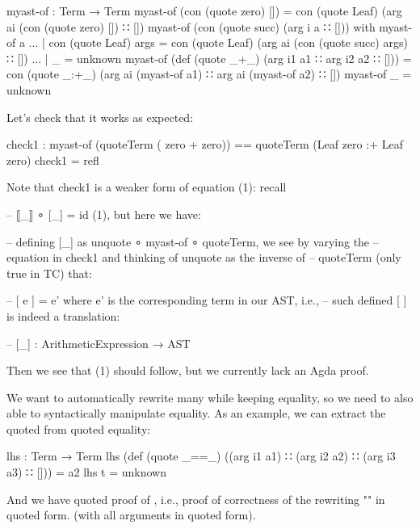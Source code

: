 \documentclass{article}
\begin{document}
\begin{code}
myast-of : Term → Term
myast-of (con (quote zero) []) = con (quote Leaf) (arg ai (con (quote zero) []) ∷ [])
myast-of (con (quote succ) (arg i a ∷ [])) with myast-of a
... | con (quote Leaf) args = con (quote Leaf) (arg ai (con (quote succ) args) ∷ [])
... | _ = unknown
myast-of (def (quote _+_) (arg i1 a1 ∷ arg i2 a2 ∷ [])) =
  con (quote _:+_) (arg ai (myast-of a1) ∷ arg ai (myast-of a2) ∷ [])
myast-of _ = unknown
\end{code}

Let's check that it works as expected:

\begin{code}
check1 : myast-of (quoteTerm ( zero + zero)) == quoteTerm (Leaf zero :+ Leaf zero)
check1 = refl
\end{code}

Note that check1 is a weaker form of equation (1): recall

\begin{code}
-- ⟦_⟧ ∘ [_] = id (1), but here we have:

-- defining [_] as unquote ∘ myast-of ∘ quoteTerm, we see by varying the
-- equation in check1 and thinking of unquote as the inverse of
-- quoteTerm (only true in TC) that:

-- [ e ] = e' where e' is the corresponding term in our AST, i.e.,
-- such defined [ ] is indeed a translation:

-- [_] : ArithmeticExpression → AST
\end{code}

Then we see that (1) should follow, but we currently lack an Agda proof.

We want to automatically rewrite many  \AgdaOperator{\AgdaFunction{+}}  while keeping equality, so we need to also able to syntactically manipulate equality. As an example, we can extract the quoted  from quoted equality:

\begin{code}
lhs : Term → Term
lhs (def (quote _==_) ((arg i1 a1) ∷ (arg i2 a2) ∷ (arg i3 a3) ∷ [])) = a2 
lhs t = unknown
\end{code}

And we have quoted proof of    \AgdaOperator{\AgdaDatatype{==}}     , i.e., proof of correctness of the rewriting "" in quoted form. (with all arguments in quoted form).  %
\end{document}
